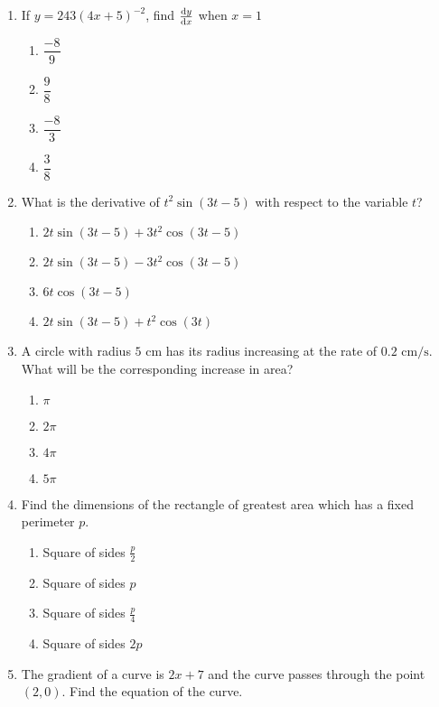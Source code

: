 \begin{multicols}{2}
\begin{enumerate}[label={\arabic*.}]
    \item If \(y = 243{(4x+5)}^{-2}\), find \(\frac{\mathrm{d}y}{\mathrm{d}x}\) when \(x = 1\)
      \begin{enumerate}[label={\Alph*.}]
        \item \(\dfrac{-8}{9}\)
        \item \(\dfrac{9}{8}\)
        \item \(\dfrac{-8}{3}\)
        \item \(\dfrac{3}{8}\)
      \end{enumerate}
    \item What is the derivative of \({t}^{2}\sin(3t-5)\) with respect to the variable \(t\)?
      \begin{enumerate}[label={\Alph*.}]
        \item \(2t \sin(3t-5) + 3{t}^2\cos(3t-5)\)
        \item \(2t \sin(3t-5) - 3{t}^2\cos(3t-5)\)
        \item \(6t\cos(3t-5)\)
        \item \(2t \sin(3t-5) + t^2\cos(3t)\)
      \end{enumerate}
    \item A circle with radius \(5\) cm has its radius increasing at the rate of \(0.2 \text{ cm/s}\). What will be the corresponding increase in area?
      \begin{enumerate}[label={\Alph*.}]
        \item \(\pi\)
        \item \(2\pi\)
        \item \(4\pi\)
        \item \(5\pi\)
      \end{enumerate}
    \item Find the dimensions of the rectangle of greatest area which has a fixed perimeter \(p\).
      \begin{enumerate}[label={\Alph*.}]
        \item Square of sides \(\frac{p}{2}\)
        \item Square of sides \(p\)
        \item Square of sides \(\frac{p}{4}\)
        \item Square of sides \(2p\)
      \end{enumerate}
    \item The gradient of a curve is \(2x+7\) and the curve passes through the point \((2, 0)\). Find the equation of the curve.
      \begin{enumerate}[label={\Alph*.}]

\end{enumerate}
\end{enumerate}
\end{multicols}
